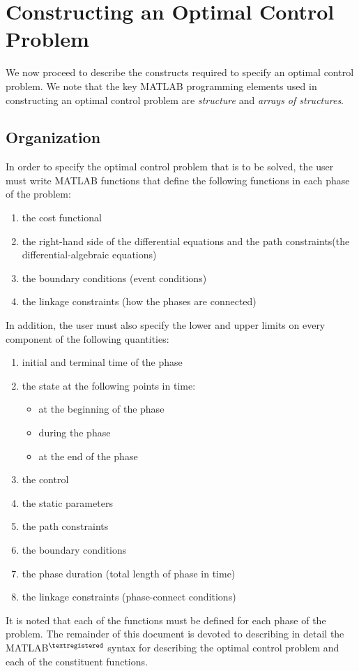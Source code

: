 \documentclass[10pt,final]{report}
\begin{document}


\tableofcontents

\newpage


\chapter{Constructing an Optimal Control Problem}

We now proceed to describe the constructs required to specify an
optimal control problem.  We note that the key
MATLAB programming elements used in constructing an optimal control
problem are {\em structure} and {\em arrays of structures}.

\section{Organization}
 In order to specify the optimal control
problem that is to be solved, the user must write MATLAB functions that
define the following functions in each phase of the problem:
\begin{enumerate}[(1)]
  \item the cost functional
  \item the right-hand side of the differential equations and the path constraints(\ie the differential-algebraic equations)
  \item the boundary conditions (\ie event conditions)
  \item the linkage constraints (\ie how the phases are connected)
\end{enumerate}
In addition, the user must also specify the lower and upper limits on every component of the following quantities:
\begin{enumerate}[(1)]
  \item initial and terminal time of the phase
  \item the state at the following points in time:
    \begin{itemize}
    \item at the beginning of the phase
    \item during the phase
    \item at the end of the phase
    \end{itemize}
  \item the control
  \item the static parameters
  \item the path constraints
  \item the boundary conditions
  \item the phase duration (\ie total length of phase in time)
  \item the linkage constraints (\ie phase-connect conditions)
\end{enumerate}
It is noted that each of the functions must be defined for each phase
of the problem. The remainder of this document is devoted to describing in detail the
MATLAB${}^{\textregistered}$ syntax for describing the optimal control problem and each of the constituent functions.
\end{document}
